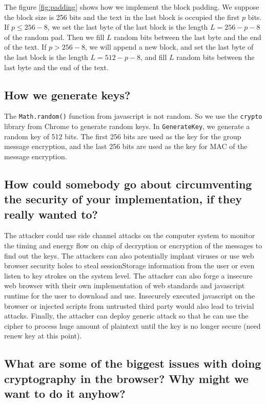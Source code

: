 The figure \ref{fig:padding} shows how we implement the block padding. We suppose the block size is 256 bits and the text in the last block is occupied the first $p$ bits. If $p \le 256 - 8$, we set the last byte of the last block is the length $L = 256 - p - 8$ of the random pad. Then we fill $L$ random bits between the last byte and the end of the text. 
If $p > 256 - 8$, we will append a new block, and set the last byte of the last block is the length $L = 512 - p - 8$, and fill $L$ random bits between the last byte and the end of the text. 

\subsection{How we generate keys?}
The \texttt{Math.random()} function from javascript is not random. So we use the \texttt{crypto} library from Chrome to generate random keys. In \texttt{GenerateKey}, we generate a random key of 512 bits. The first 256 bits are used as the key for the group message encryption, and the last 256 bits are used as the key for MAC of the message encryption. 

\subsection{How could somebody go about circumventing the security of your implementation, if they really wanted to?}
The attacker could use side channel attacks on the computer system to monitor the timing and energy flow on chip of decryption or encryption of the messages to find out the keys. The attackers can also potentially implant viruses or use web browser security holes to steal sessionStorage information from the user or even listen to key strokes on the system level. The attacker can also forge a insecure web browser with their own implementation of web standards and javascript runtime for the user to download and use. Insecurely executed javascript on the browser or injected scripts from untrusted third party would also lead to trivial attacks. Finally, the attacker can deploy generic attack so that he can use the cipher to process huge amount of plaintext until the key is no longer secure (need renew key at this point).

\subsection{What are some of the biggest issues with doing cryptography in the browser? Why might we want to do it anyhow?} 

